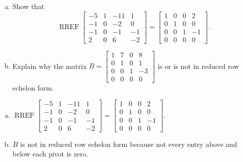 
\begin{exerciseStatement}

\begin{enumerate}[(a)]
\item Show that \[\operatorname{RREF} \left[\begin{array}{cccc}
-5 & 1 & -11 & 1 \\
-1 & 0 & -2 & 0 \\
-1 & 0 & -1 & -1 \\
2 & 0 & 6 & -2
\end{array}\right] = \left[\begin{array}{cccc}
1 & 0 & 0 & 2 \\
0 & 1 & 0 & 0 \\
0 & 0 & 1 & -1 \\
0 & 0 & 0 & 0
\end{array}\right] .\]
\item Explain why the matrix \(B= \left[\begin{array}{cccc}
1 & 7 & 0 & 8 \\
0 & 1 & 0 & 1 \\
0 & 0 & 1 & -3 \\
0 & 0 & 0 & 0
\end{array}\right] \) is or is not in reduced row echelon form.
\end{enumerate}
    
\end{exerciseStatement}
    
\begin{exerciseAnswer} 

\begin{enumerate}[(a)]
\item \(\operatorname{RREF} \left[\begin{array}{cccc}
-5 & 1 & -11 & 1 \\
-1 & 0 & -2 & 0 \\
-1 & 0 & -1 & -1 \\
2 & 0 & 6 & -2
\end{array}\right] = \left[\begin{array}{cccc}
1 & 0 & 0 & 2 \\
0 & 1 & 0 & 0 \\
0 & 0 & 1 & -1 \\
0 & 0 & 0 & 0
\end{array}\right] .\)
\item \(B\) is not in reduced row echelon form because not every entry above and below each pivot is zero. 
\end{enumerate}
    
\end{exerciseAnswer}
    
